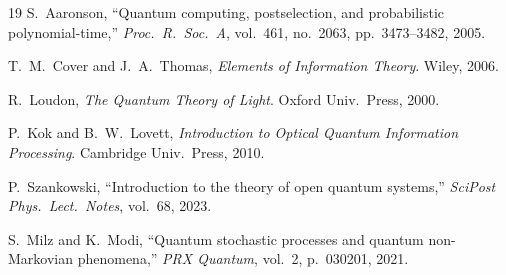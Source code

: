 \documentclass[journal,twocolumn]{IEEEtran}
\theoremstyle{definition}
\theoremstyle{plain}
\begin{document}
\begin{thebibliography}{19}
S.~Aaronson, ``Quantum computing, postselection, and probabilistic
polynomial-time,'' \emph{Proc.\ R.\ Soc.\ A}, vol.~461, no.~2063,
pp.~3473--3482, 2005.

T.~M.~Cover and J.~A.~Thomas, \emph{Elements of Information Theory}.
Wiley, 2006.

R.~Loudon, \emph{The Quantum Theory of Light}. Oxford Univ.\ Press,
2000.

P.~Kok and B.~W.~Lovett, \emph{Introduction to Optical Quantum
Information Processing}. Cambridge Univ.\ Press, 2010.

P.~Szankowski, ``Introduction to the theory of open quantum systems,''
\emph{SciPost Phys.\ Lect.\ Notes}, vol.~68, 2023.

S.~Milz and K.~Modi, ``Quantum stochastic processes and quantum
non-Markovian phenomena,'' \emph{PRX Quantum}, vol.~2, p.~030201, 2021.

\end{thebibliography}
\end{document}
